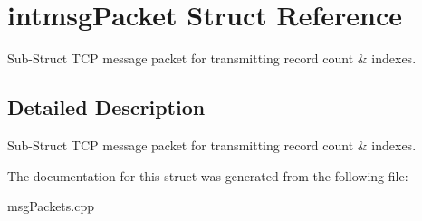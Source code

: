 \hypertarget{structintmsgPacket}{\section{intmsg\-Packet Struct Reference}
\label{structintmsgPacket}
}


Sub-\/\-Struct T\-C\-P message packet for transmitting record count \& indexes.  




\subsection{Detailed Description}
Sub-\/\-Struct T\-C\-P message packet for transmitting record count \& indexes. 

The documentation for this struct was generated from the following file\-:\begin{DoxyCompactItemize}
\item 
msg\-Packets.\-cpp\end{DoxyCompactItemize}
